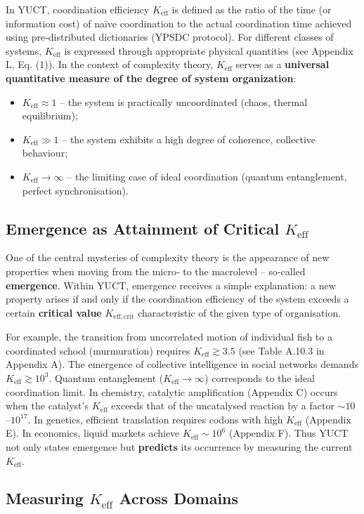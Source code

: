 \documentclass[11pt]{article}
\theoremstyle{remark}
\newcommand{\Keff}{K_{\mathrm{eff}}}
\newcommand{\Keffcrit}{K_{\mathrm{eff},\text{crit}}}
\begin{document}
	In YUCT, coordination efficiency $\Keff$ is defined as the ratio of the time (or information cost) of naïve coordination to the actual coordination time achieved using pre‑distributed dictionaries (YPSDC protocol). For different classes of systems, $\Keff$ is expressed through appropriate physical quantities (see Appendix L, Eq. (1)). In the context of complexity theory, $\Keff$ serves as a \textbf{universal quantitative measure of the degree of system organization}:
	\begin{itemize}
		\item $\Keff \approx 1$ – the system is practically uncoordinated (chaos, thermal equilibrium);
		\item $\Keff \gg 1$ – the system exhibits a high degree of coherence, collective behaviour;
		\item $\Keff \to \infty$ – the limiting case of ideal coordination (quantum entanglement, perfect synchronisation).
	\end{itemize}
	
	\subsection{Emergence as Attainment of Critical $\Keff$}
	
	One of the central mysteries of complexity theory is the appearance of new properties when moving from the micro‑ to the macrolevel – so‑called \textbf{emergence}. Within YUCT, emergence receives a simple explanation: a new property arises if and only if the coordination efficiency of the system exceeds a certain \textbf{critical value} $\Keffcrit$ characteristic of the given type of organisation.
	
	For example, the transition from uncorrelated motion of individual fish to a coordinated school (murmuration) requires $\Keff \gtrsim 3.5$ (see Table A.10.3 in Appendix A). The emergence of collective intelligence in social networks demands $\Keff \gtrsim 10^3$. Quantum entanglement ($\Keff \to \infty$) corresponds to the ideal coordination limit. In chemistry, catalytic amplification (Appendix C) occurs when the catalyst’s $\Keff$ exceeds that of the uncatalysed reaction by a factor $\sim 10$–$10^{17}$. In genetics, efficient translation requires codons with high $\Keff$ (Appendix E). In economics, liquid markets achieve $\Keff \sim 10^6$ (Appendix F). Thus YUCT not only states emergence but \textbf{predicts} its occurrence by measuring the current $\Keff$.
	
	\subsection{Measuring $\Keff$ Across Domains}
	
\end{document}
